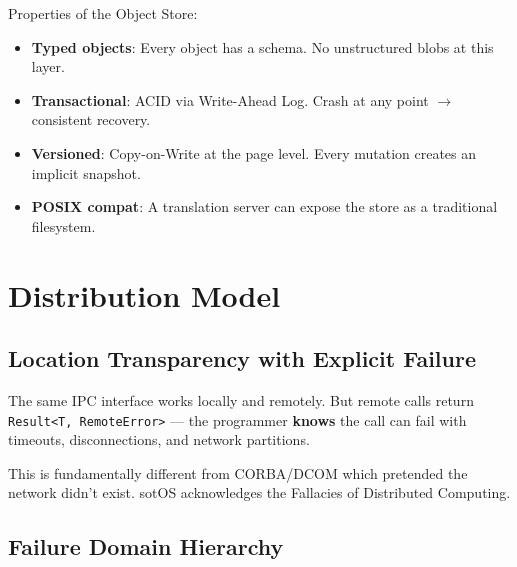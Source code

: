 \documentclass[11pt,a4paper]{article}
\begin{document}
Properties of the Object Store:
\begin{itemize}[leftmargin=2em]
  \item \textbf{Typed objects}: Every object has a schema. No unstructured blobs at this layer.
  \item \textbf{Transactional}: ACID via Write-Ahead Log. Crash at any point $\rightarrow$ consistent recovery.
  \item \textbf{Versioned}: Copy-on-Write at the page level. Every mutation creates an implicit snapshot.
  \item \textbf{POSIX compat}: A translation server can expose the store as a traditional filesystem.
\end{itemize}

\section{Distribution Model}

\subsection{Location Transparency with Explicit Failure}

The same IPC interface works locally and remotely. But remote calls return
\texttt{Result<T, RemoteError>} --- the programmer \textbf{knows} the call can fail
with timeouts, disconnections, and network partitions.

This is fundamentally different from CORBA/DCOM which pretended the network
didn't exist. sotOS acknowledges the Fallacies of Distributed Computing.

\subsection{Failure Domain Hierarchy}
\end{document}
